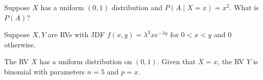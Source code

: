\documentclass[addpoints,12pt]{exam}
\begin{document}
\begin{questions}
\vspace{2.75in}

\question Suppose $X$ has a uniform $(0,1)$ distribution and $P(A\mid X=x)=x^2$. What is $P(A)$?

\vspace{1.7in}

\question Suppose $X,Y$ are RVs with JDF $f(x,y)=\lambda^3 xe^{-\lambda y}$ for $0<x<y$ and 0 otherwise.

\noaddpoints
{}
\addpoints

\question[8] The RV $X$ has a uniform distribution on $(0,1)$. Given that $X=x$, the RV $Y$ is binomial with parameters $n=5$ and $p=x$.

\noaddpoints
{}
\addpoints

\end{questions}
\end{document}
